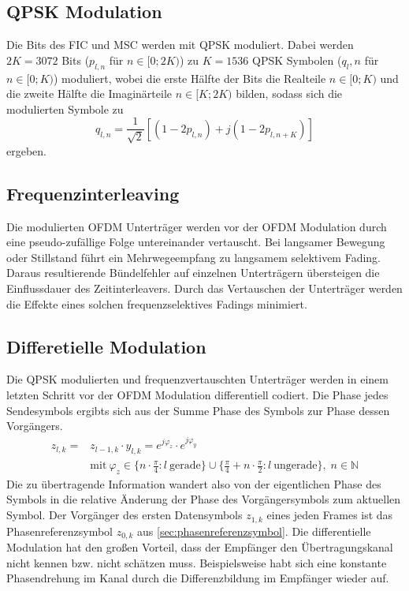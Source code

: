 \subsection{QPSK Modulation}
\label{sec:qpsk}
Die Bits des FIC und MSC werden mit QPSK moduliert. Dabei werden $2K=3072$ Bits ($p_{l,n}$ für $n\in[0;2K)$) zu $K=1536$ QPSK Symbolen ($q_l,n$ für $n\in[0;K)$) moduliert, wobei die erste Hälfte der Bits die Realteile $n\in [0;K)$ und die zweite Hälfte die Imaginärteile $n\in [K;2K)$ bilden, sodass sich die modulierten Symbole zu
\begin{equation}
q_{l,n} = \frac{1}{\sqrt{2}}\left[\left(1-2p_{l,n}\right)+j\left(1-2p_{l,n+K}\right)\right]
\end{equation}
ergeben.

\subsection{Frequenzinterleaving}
Die modulierten OFDM Unterträger werden vor der OFDM Modulation durch eine pseudo-zufällige Folge untereinander vertauscht. Bei langsamer Bewegung oder Stillstand führt ein Mehrwegeempfang zu langsamem selektivem Fading. Daraus resultierende Bündelfehler auf einzelnen Unterträgern übersteigen die Einflussdauer des Zeitinterleavers. Durch das Vertauschen der Unterträger werden die Effekte eines solchen frequenzselektives Fadings minimiert. 


\subsection{Differetielle Modulation}
\label{sec:diff_mod}
Die QPSK modulierten und frequenzvertauschten Unterträger werden in einem letzten Schritt vor der OFDM Modulation differentiell codiert. Die Phase jedes Sendesymbols ergibts sich aus der Summe Phase des Symbols zur Phase dessen Vorgängers.
\begin{equation}
\begin{aligned}
z_{l,k} = &z_{l-1,k}\cdot y_{l,k} = e^{j\varphi_z} \cdot e^{j\varphi_y} \\
&\text{mit} \: \varphi_z \in \{n \cdot \frac{\pi}{4}: l \: \text{gerade}\} \cup \{\frac{\pi}{4} + n \cdot \frac{\pi}{2}: l \: \text{ungerade}\}, \; n\in \mathbb{N} 
\end{aligned}
\end{equation}
Die zu übertragende Information wandert also von der eigentlichen Phase des Symbols in die relative Änderung der Phase des Vorgängersymbols zum aktuellen Symbol. Der Vorgänger des ersten Datensymbols $z_{1,k}$ eines jeden Frames ist das Phasenreferenzsymbol $z_{0,k}$ aus \ref{sec:phasenreferenzsymbol}. Die differentielle Modulation hat den großen Vorteil, dass der Empfänger den Übertragungskanal nicht kennen bzw. nicht schätzen muss. Beispielsweise habt sich eine konstante Phasendrehung im Kanal durch die Differenzbildung im Empfänger wieder auf.

